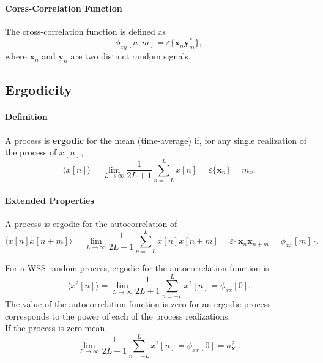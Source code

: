 \paragraph{Corss-Correlation Function} The cross-correlation function is defined as 
\[
    \phi_{xy} [n,m] = \varepsilon\{\mathbf{x}_n \mathbf{y}_m^*\},
\]
where $\mathbf{x}_n$ and $\mathbf{y}_n$ are two distinct random signals.

\subsection{Ergodicity}
\paragraph{Definition}  A process is \textbf{ergodic} for the mean (time-average) if, for any single realization of the process of $x[n]$,
\[
    \langle x[n] \rangle = \lim_{L\to \infty} \frac{1}{2L+1} \sum_{n=-L}^{L} x[n] = \varepsilon\{\mathbf{x}_n\} = m_{x}.
\]

\paragraph{Extended Properties} A process is ergodic for the autocorrelation of
\[
    \langle x[n] x[n+m] \rangle = \lim_{L\to\infty} \frac{1}{2L+1} \sum_{n=-L}^{L} x[n] x[n+m] = \varepsilon\{\mathbf{x}_{n}\mathbf{x}_{n+m} = \phi_{xx}[m] \}.
\]

For a WSS random process, ergodic for the autocorrelation function is
\[
    \langle x^2[n] \rangle = \lim_{L\to\infty} \frac{1}{2L+1} \sum_{n=-L}^{L} x^2[n] = \phi_{xx}[0].
\]
The value of the autocorrelation function is zero for an ergodic process corresponds to the power of each of the process realizations.\\

If the process is zero-mean, 
\[
    \lim_{L\to\infty} \frac{1}{2L+1}\sum_{n=-L}^{L} x^2[n] = \phi_{xx}[0] = \sigma_{\mathbf{x}_n}^2.
\]

